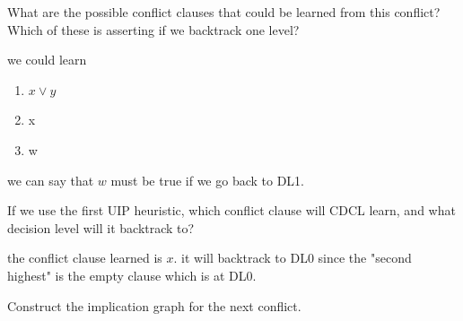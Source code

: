 \documentclass[11pt]{article}
\begin{document}
\begin{qunlist}
\begin{qparts}
  \item
    What are the possible conflict clauses that could be learned from this conflict? Which of these is asserting if we backtrack one level?

    \begin{answer}
      we could learn
      \begin{enumerate}
        \item \(x\lor y\)
        \item x
        \item w
      \end{enumerate}
      we can say that \(w\) must be true if we go back to DL1.
    \end{answer}

  \item
    If we use the first UIP heuristic, which conflict clause will CDCL learn, and what decision level will it backtrack to?

    \begin{answer}
      the conflict clause learned is \(x\). it will backtrack to DL0 since the "second highest" is the empty clause which is at DL0.
    \end{answer}

  \item
    Construct the implication graph for the next conflict.


\end{qparts}
\end{qunlist}
\end{document}
